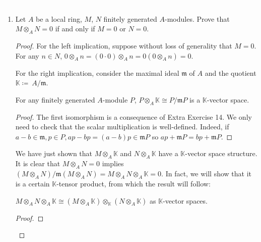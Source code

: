 \begin{problem}\textcolor{white}{.}

    \begin{enumerate}[label=(\theproblem.\arabic*),ref=\theproblem.\arabic*]
        \item Let $A$ be a local ring, $M$, $N$ finitely generated $A$-modules.
        Prove that $M \otimes_A N = 0$ if and only if $M = 0$ or $N = 0$.
            \begin{sol}
                \begin{proof}
                    For the left implication, suppose without loss of generality that $M = 0$.
                    For any $n \in N$, $0 \otimes_A n = (0\cdot0) \otimes_A n = 0(0 \otimes_A n) = 0$.

                    For the right implication, consider the maximal ideal $\mathfrak{m}$ of $A$
                    and the quotient $\mathbb{K}\coloneqq~A/\mathfrak{m}$.
                    \begin{claim}
                        For any finitely generated $A$-module $P$, 
                        $P \otimes_A \mathbb{K} \cong P/\mathfrak{m}P$ is a $\mathbb{K}$-vector space.
                        \begin{proof}
                            The first isomorphism is a consequence of Extra Exercise 14.
                            We only need to check that the scalar multiplication is well-defined.
                            Indeed, if $a - b \in \mathfrak{m}, p \in P, ap - bp = (a-b) p \in \mathfrak{m}P$
                            so $ap + \mathfrak{m}P = bp + \mathfrak{m}P$.
                        \end{proof}
                    \end{claim}

                    We have just shown that $M \otimes_A \mathbb{K}$ and $N \otimes_A \mathbb{K}$ have a $\mathbb{K}$-vector space structure.
                    It is clear that $M \otimes_A N = 0$ implies $(M \otimes_A N) / \mathfrak{m}(M \otimes_A N) = M \otimes_A  N \otimes_A \mathbb{K} = 0$.
                    In fact, we will show that it is a certain $\mathbb{K}$-tensor product, from which the result will follow:

                    \begin{claim}
                        $M \otimes_A N \otimes_A \mathbb{K} \cong (M \otimes_A \mathbb{K}) \otimes_{\mathbb{K}} (N \otimes_A \mathbb{K})$ as $\mathbb{K}$-vector spaces.
                            \begin{proof}


\end{proof}
\end{claim}
\end{proof}
\end{sol}
\end{enumerate}
\end{problem}

